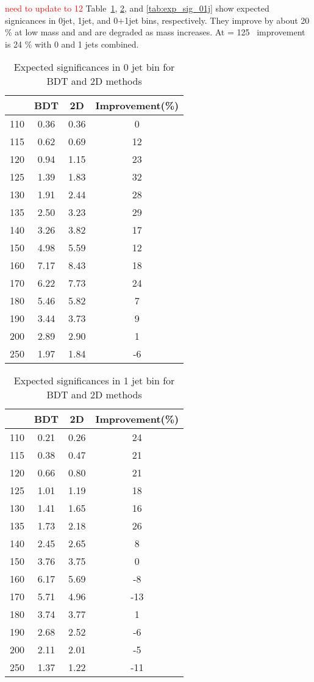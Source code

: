 \textcolor{red}{need to update to 12 \ifb} 
Table~\ref{tab:exp_sig_0j}, \ref{tab:exp_sig_1j}, and \ref{tab:exp_sig_01j} 
show expected signicances in 0jet, 1jet, and 0+1jet bins, respectively.
They improve by about 20 \% at low mass and 
and are degraded as mass increases. 
At \mHi = 125 \GeV~improvement is 24 \% with 0 and 1 jets combined.

\begin{table}[!htb] 
	\centering
	\begin{tabular}{c | c c | c }
   	\hline \hline
	\mHi & BDT & 2D & Improvement(\%) \\
	\hline
	110	& 0.36 & 0.36 & 0	\\
	115	& 0.62 & 0.69 & 12	\\
	120	& 0.94 & 1.15 & 23 	\\
	125	& 1.39 & 1.83 & 32 	\\
	130	& 1.91 & 2.44 & 28 	\\
	135	& 2.50 & 3.23 & 29 	\\
	140	& 3.26 & 3.82 & 17 	\\
	150	& 4.98 & 5.59 & 12 	\\
	160	& 7.17 & 8.43 & 18 	\\
	170	& 6.22 & 7.73 & 24 	\\
	180	& 5.46 & 5.82 & 7 	\\
	190	& 3.44 & 3.73 & 9 	\\
	200	& 2.89 & 2.90 & 1 	\\
	250	& 1.97 & 1.84 & -6 	\\
   	\hline \hline
	\end{tabular}
	\label{tab:exp_sig_0j}
	\caption{Expected significances in 0 jet bin for BDT and 2D methods}
\end{table}


\begin{table}[!htb] 
	\centering
	\begin{tabular}{c | c c | c }
   	\hline \hline
	\mHi & BDT & 2D & Improvement(\%) \\
	\hline
	110 & 0.21 & 0.26 & 24	\\
	115 & 0.38 & 0.47 & 21	\\
	120 & 0.66 & 0.80 & 21	\\
	125 & 1.01 & 1.19 & 18	\\
	130 & 1.41 & 1.65 & 16	\\
	135 & 1.73 & 2.18 & 26	\\
	140 & 2.45 & 2.65 & 8	\\
	150 & 3.76 & 3.75 & 0	\\
	160 & 6.17 & 5.69 & -8	\\
	170 & 5.71 & 4.96 & -13	\\
	180 & 3.74 & 3.77 & 1	\\
	190 & 2.68 & 2.52 & -6	\\
	200 & 2.11 & 2.01 & -5	\\
	250 & 1.37 & 1.22 & -11	\\
   	\hline \hline
	\end{tabular}
	\label{tab:exp_sig_1j}
	\caption{Expected significances in 1 jet bin for BDT and 2D methods}
\end{table}
  
